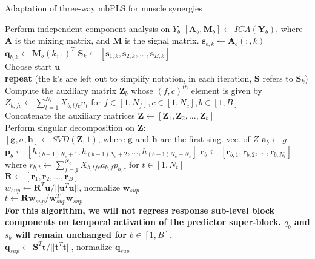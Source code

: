 \documentclass[11pt]{article}
\begin{document}
\begin{algorithm}
\caption{Adaptation of three-way mbPLS for muscle synergies}
\label{threewaymbPLS}
\begin{algorithmic}[1]
\State Perform independent component analysis on $Y_b$
\State $[\textbf{A}_b,\textbf{M}_b] \leftarrow ICA(\textbf{Y}_b)$, where $\textbf{A}$ is the mixing matrix, and $\textbf{M}$ is the signal matrix. 
\State $\textbf{s}_{b,k} \leftarrow \textbf{A}_b(:,k)$
\State $\textbf{q}_{b,k} \leftarrow \textbf{M}_b(k,:)^T$
\EndFor
\EndFor
{}
\State$\textbf{S}_k \leftarrow [\textbf{s}_{1,k}, \textbf{s}_{2,k}, ..., \textbf{s}_{B,k}]$
\EndFor
\\Choose start $\textbf{u}$
\\\textbf{repeat}  (the k's are left out to simplify notation, in each iteration, $\textbf{S}$ refers to $\textbf{S}_k$)
\\Compute the auxiliary matrix $\textbf{Z}_b$ whose $(f,c)^{th}$ element is given by $Z_{b,fc} \leftarrow \sum_{t=1}^{N_t} X_{b,tfc}u_t$ for $f \in [1,N_f], c \in [1,N_c], b \in [1,B]$
\\Concatenate the auxiliary matrices $\textbf{Z} \leftarrow [\textbf{Z}_1, \textbf{Z}_2, ..., \textbf{Z}_b]$
\\Perform singular decomposition on \textbf{Z}:
\\$[\textbf{g},\sigma,\textbf{h}] \leftarrow SVD(\textbf{Z},1)$, where $\textbf{g}$ and $\textbf{h}$ are the first sing. vec. of $Z$
\State$\textbf{a}_b \leftarrow g$
\State$\textbf{p}_b \leftarrow [h_{(b-1)N_c+1}, h_{(b-1)N_c+2}, ..., h_{(b-1)N_c+N_c}]$
\State$\textbf{r}_b \leftarrow [\textbf{r}_{b,1}, \textbf{r}_{b,2}, ..., \textbf{r}_{b,N_t}]$ where $r_{b,t} \leftarrow \sum_{f=1}^{N_c} X_{b,tfc}a_{b,f}p_{b,c}$ for $t \in [1,N_t]$
\EndFor
\\$\textbf{R} \leftarrow [\textbf{r}_1, \textbf{r}_2, ..., \textbf{r}_B]$
\\$w_{sup} \leftarrow \textbf{R}^T \textbf{u} / ||\textbf{u}^T \textbf{u}||$, normalize $\textbf{w}_{sup}$
\\$t \leftarrow \textbf{R} \textbf{w}_{sup} / \textbf{w}_{sup}^T \textbf{w}_{sup}$
\\ \textbf{For this algorithm, we will not regress response sub-level block components on temporal activation of the predictor super-block. $q_b$ and $s_b$ will remain unchanged for $b \in [1,B]$.}
\\$\textbf{q}_{sup} \leftarrow \textbf{S}^T \textbf{t} / ||\textbf{t}^T \textbf{t}||$, normalize $\textbf{q}_{sup}$

\end{algorithmic}
\end{algorithm}
\end{document}
